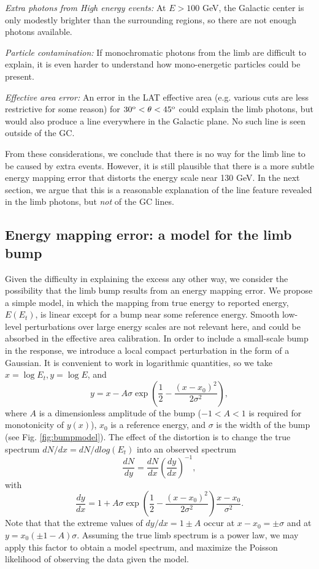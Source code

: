 \documentclass[aps,twocolumn,prd,superscriptaddress,showpacs,nofootinbib,fixfloat]{revtex4}
\newcommand{\be}{\begin{equation}}
\newcommand{\ee}{\end{equation}}
\newcommand{\degree}{^{\rm o}}
\begin{document}
{\it Extra photons from High energy events:} At $E > 100$
GeV, the Galactic center is only modestly brighter than the
surrounding regions, so there are not enough photons
available.

{\it Particle contamination:} If monochromatic photons from
the limb are difficult to explain, it is even harder to
understand how mono-energetic particles could be present.

{\it Effective area error:} An error in the LAT effective
area (e.g. various cuts are less restrictive for some
reason) for $30\degree < \theta < 45\degree$ could explain
the limb photons, but would also produce a line everywhere
in the Galactic plane.  No such line is seen outside of the
GC.
\medskip

From these considerations, we conclude that there is no way
for the limb line to be caused by extra events. However, it
is still plausible that there is a more subtle energy
mapping error that distorts the energy scale near 130 GeV.
In the next section, we argue that this is a reasonable
explanation of the line feature revealed in the limb
photons, but {\em not} of the GC lines. 

\subsection{Energy mapping error: a model for the limb bump}

 
Given the difficulty in explaining the excess any other way,
we consider the possibility that the limb bump results from
an energy mapping error.  We propose a simple model, in
which the mapping from true energy to reported energy,
$E(E_t)$, is linear except for a bump near some reference
energy.  Smooth low-level perturbations over large energy
scales are not relevant here, and could be absorbed in the
effective area calibration.  In order to include a
small-scale bump in the response, we introduce a local
compact perturbation in the form of a Gaussian.  It is
convenient to work in logarithmic quantities, so we take
$x=\log E_t, y=\log E$, and \be
\label{eq:yofx}
y=x - A\sigma \exp\left(\frac{1}{2}-\frac{(x-x_0)^2}{2\sigma^2}\right),
\ee
where $A$ is a dimensionless amplitude of the bump ($-1<A<1$ is required
for monotonicity of $y(x)$), $x_0$ is a reference energy, and $\sigma$ is the
width of the bump (see Fig. \ref{fig:bumpmodel}).
The effect of the distortion is to change the true spectrum $dN/dx =
dN/dlog(E_t)$ into an observed spectrum
\be
\label{eq:dndy}
\frac{dN}{dy} = \frac{dN}{dx} \left(\frac{dy}{dx}\right)^{-1} ,
\ee
with
\be
\label{eq:dydx}
\frac{dy}{dx} = 1 + A\sigma \exp\left(\frac{1}{2}-\frac{(x-x_0)^2}{2\sigma^2}\right)
\frac{x-x_0}{\sigma^2}.
\ee
Note that that the extreme values of $dy/dx = 1 \pm A$ occur at $x-x_0 = \pm
\sigma$ and at $y=x_0(\pm1-A)\sigma$.  Assuming the true limb spectrum is a
power law, we may apply this factor to obtain a model spectrum, and maximize
the Poisson likelihood of observing the data given the model.
\end{document}
